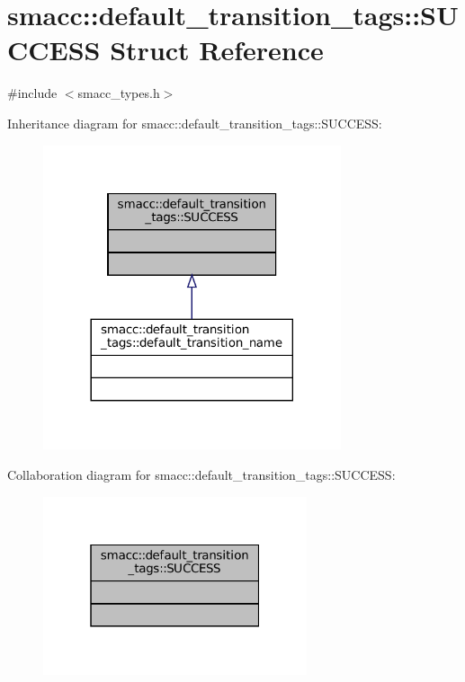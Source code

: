 \hypertarget{structsmacc_1_1default__transition__tags_1_1SUCCESS}{}\section{smacc\+:\+:default\+\_\+transition\+\_\+tags\+:\+:S\+U\+C\+C\+E\+SS Struct Reference}
\label{structsmacc_1_1default__transition__tags_1_1SUCCESS}


{\ttfamily \#include $<$smacc\+\_\+types.\+h$>$}



Inheritance diagram for smacc\+:\+:default\+\_\+transition\+\_\+tags\+:\+:S\+U\+C\+C\+E\+SS\+:
\nopagebreak
\begin{figure}[H]
\begin{center}
\leavevmode
\includegraphics[width=248pt]{structsmacc_1_1default__transition__tags_1_1SUCCESS__inherit__graph}
\end{center}
\end{figure}


Collaboration diagram for smacc\+:\+:default\+\_\+transition\+\_\+tags\+:\+:S\+U\+C\+C\+E\+SS\+:
\nopagebreak
\begin{figure}[H]
\begin{center}
\leavevmode
\includegraphics[width=220pt]{structsmacc_1_1default__transition__tags_1_1SUCCESS__coll__graph}
\end{center}
\end{figure}


